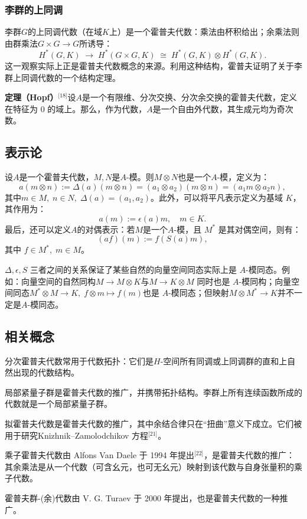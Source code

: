 \subsubsection{李群的上同调}
李群$G$的上同调代数（在域$K$上）是一个霍普夫代数：乘法由杯积给出；余乘法则由群乘法$G \times G \to G$所诱导：
$$
H^{*}(G,K) \;\longrightarrow\; H^{*}(G \times G,K) \;\cong\; H^{*}(G,K) \otimes H^{*}(G,K) .~
$$
这一观察实际上正是霍普夫代数概念的来源。利用这种结构，霍普夫证明了关于李群上同调代数的一个结构定理。

\textbf{定理（Hopf）}\(^\text{[18]}\)设$A$是一个有限维、分次交换、分次余交换的霍普夫代数，定义在特征为 0 的域上。那么，作为代数，$A$是一个自由外代数，其生成元均为奇次数。
\subsection{表示论}
设$A$是一个霍普夫代数，$M, N$是$A$-模。则$M \otimes N$也是一个$A$-模，定义为：
$$
a (m \otimes n) := \Delta(a)(m \otimes n) = (a_{1} \otimes a_{2})(m \otimes n) = (a_{1}m \otimes a_{2}n),~
$$
其中$m \in M, \; n \in N,\; \Delta(a) = (a_1, a_2)$。此外，可以将平凡表示定义为基域 $K$，其作用为：
$$
a(m) := \epsilon(a) m, \quad m \in K.~
$$
最后，还可以定义$A$的对偶表示：若$M$是一个$A$-模，且 $M^{*}$ 是其对偶空间，则有：
$$
(af)(m) := f(S(a)m), ~
$$
其中 $f \in M^{*}, \; m \in M$。

$\Delta, \epsilon, S$ 三者之间的关系保证了某些自然的向量空间同态实际上是 $A$-模同态。例如：向量空间的自然同构$M \to M \otimes K$与$M \to K \otimes M$ 同时也是 $A$-模同构；向量空间同态$M^{*} \otimes M \to K,\; f \otimes m \mapsto f(m)$也是 $A$-模同态；但映射$M \otimes M^{*} \to K$并不一定是$A$-模同态。
\subsection{相关概念}
分次霍普夫代数常用于代数拓扑：它们是$H$-空间所有同调或上同调群的直和上自然出现的代数结构。

局部紧量子群是霍普夫代数的推广，并携带拓扑结构。李群上所有连续函数所成的代数就是一个局部紧量子群。

拟霍普夫代数是霍普夫代数的推广，其中余结合律只在“扭曲”意义下成立。它们被用于研究Knizhnik–Zamolodchikov 方程\(^\text{[21]}\)。

乘子霍普夫代数由 Alfons Van Daele 于 1994 年提出\(^\text{[22]}\)，是霍普夫代数的推广：其余乘法是从一个代数（可含幺元，也可无幺元）映射到该代数与自身张量积的乘子代数。

霍普夫群-(余)代数由 V. G. Turaev 于 2000 年提出，也是霍普夫代数的一种推广。
